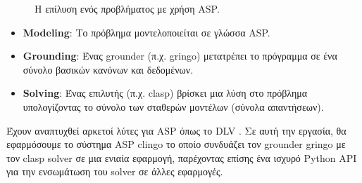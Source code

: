 \documentclass[12pt]{extarticle}
\begin{document}
\begin{figure}[htb]
    \begin{center}
    \end{center}
    \caption{Η επίλυση ενός προβλήματος με χρήση ASP.}
    \label{fig:asp-solving}
\end{figure}



\begin{itemize}
    \item \textbf{Modeling}: Το πρόβλημα μοντελοποιείται σε γλώσσα ASP.
    \item \textbf{Grounding}: Ένας grounder (π.χ. gringo) μετατρέπει το πρόγραμμα σε ένα σύνολο βασικών κανόνων και δεδομένων.
    \item \textbf{Solving}: Ένας επιλυτής (π.χ. clasp) βρίσκει μια λύση στο πρόβλημα υπολογίζοντας το σύνολο των σταθερών μοντέλων (σύνολα απαντήσεων).
\end{itemize}


Έχουν αναπτυχθεί αρκετοί λύτες για ASP όπως το DLV \cite{Xia2020}. Σε αυτή την εργασία, θα εφαρμόσουμε το σύστημα ASP clingo \cite{Gebser2014} το οποίο συνδυάζει τον grounder gringo με τον clasp solver\cite{Holldobler2014} σε μια ενιαία εφαρμογή, παρέχοντας επίσης ένα ισχυρό Python API για την ενσωμάτωση του solver σε άλλες εφαρμογές.
\end{document}
